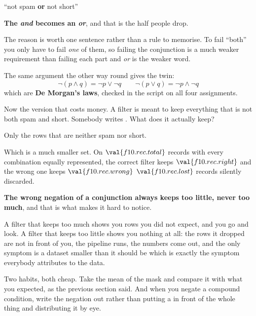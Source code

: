 \begin{fr}
\begin{ansblock}
\enquote{not spam \textbf{or} not short}
\end{ansblock}

\textbf{The \emph{and} becomes an \emph{or}}, and that is the half people drop.

The reason is worth one sentence rather than a rule to memorise. To fail
\enquote{both} you only have to fail \emph{one} of them, so failing the
conjunction is a much weaker requirement than failing each part \dash{} and
\emph{or} is the weaker word.

The same argument the other way round gives the twin:
\[ \lnot(p \land q) = \lnot p \lor \lnot q \qquad
   \lnot(p \lor q) = \lnot p \land \lnot q \]
which are \textbf{De Morgan's laws}, checked in the script on all four
assignments.

Now the version that costs money. A filter is meant to keep everything that is
not both spam and short. Somebody writes . What
does it actually keep?
\dotline
\nextframe
\end{fr}

\begin{fr}
\begin{ansblock}
Only the rows that are neither spam nor short.
\end{ansblock}

Which is a much smaller set. On $\val{f10.rec.total}$ records with every
combination equally represented, the correct filter keeps
$\val{f10.rec.right}$ and the wrong one keeps $\val{f10.rec.wrong}$ \dash{}
$\val{f10.rec.lost}$ records silently discarded.

\begin{trapbox}
\textbf{The wrong negation of a conjunction always keeps too little, never too
much}, and that is what makes it hard to notice.

A filter that keeps too much shows you rows you did not expect, and you go and
look. A filter that keeps too little shows you nothing at all: the rows it
dropped are not in front of you, the pipeline runs, the numbers come out, and
the only symptom is a dataset smaller than it should be \dash{} which is
exactly the symptom everybody attributes to the data.

Two habits, both cheap. Take the mean of the mask and compare it with what you
expected, as the previous section said. And when you negate a compound
condition, write the negation out rather than putting a  in front of
the whole thing and distributing it by eye.
\end{trapbox}
\end{fr}

